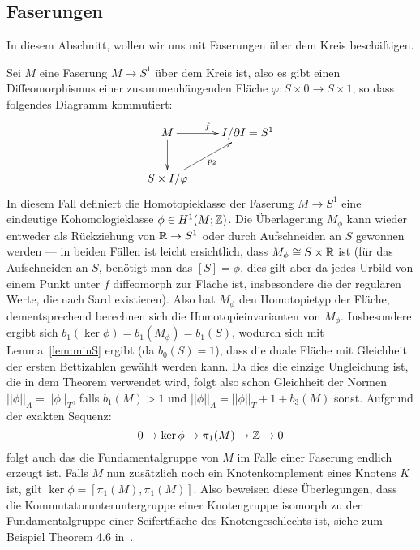     \subsection{Faserungen}

    In diesem Abschnitt, wollen wir uns mit Faserungen über dem Kreis beschäftigen.
        
    \begin{bsp}
    	Sei $M$ eine Faserung $M\to S^1$ über dem Kreis ist, also es gibt einen Diffeomorphismus einer zusammenhängenden Fläche $\varphi: S \times 0 \to S\times 1$, so dass folgendes Diagramm kommutiert:
    	\[
    		\begin{xy}
    			\xymatrix{M \ar[r]^f \ar[d] &I/\partial I = S^1 \\
    					S\times I /\varphi \ar[ru]_{p_2}}
    		\end{xy}
    	\]
    	In diesem Fall definiert die Homotopieklasse der Faserung $M \to S^1$ eine eindeutige Kohomologieklasse $\phi\in H^1(M;\mathbb{Z})$. Die Überlagerung $M_\phi$ kann wieder entweder als Rückziehung von $\mathbb{R} \to S^1$ oder durch Aufschneiden an $S$ gewonnen werden --- in beiden Fällen ist leicht ersichtlich, dass $M_\phi \cong S \times \mathbb{R}$ ist (für das Aufschneiden an $S$, benötigt man das $[S]=\phi$, dies gilt aber da jedes Urbild von einem Punkt unter $f$ diffeomorph zur Fläche ist, insbesondere die der regulären Werte, die nach Sard existieren). Also hat $M_\phi$ den Homotopietyp der Fläche, dementsprechend berechnen sich die Homotopieinvarianten von $M_\phi$.  Insbesondere ergibt sich $b_1(\ker\phi) =b_1(M_\phi)= b_1(S)$, wodurch sich mit Lemma~\ref{lem:minS} ergibt (da $b_0(S)=1$), dass die duale Fläche mit Gleichheit der ersten Bettizahlen gewählt werden kann. Da dies die einzige Ungleichung ist, die in dem Theorem verwendet wird, folgt also schon Gleichheit der Normen $||\phi||_A = ||\phi||_T$, falls $b_1(M)>1$ und $||\phi||_A = ||\phi||_T+1+b_3(M)$ sonst. Aufgrund der exakten Sequenz:
    	\[
    		0 \to \ker\phi \to \pi_1(M) \to \mathbb{Z} \to 0
    	\]
    	folgt auch das die Fundamentalgruppe von $M$ im Falle einer Faserung endlich erzeugt ist. Falls $M$ nun zusätzlich noch ein Knotenkomplement eines Knotens $K$ ist, gilt $\ker\phi = [\pi_1(M),\pi_1(M)]$. Also beweisen diese Überlegungen, dass die Kommutatorunteruntergruppe einer Knotengruppe isomorph zu der Fundamentalgruppe einer Seifertfläche des Knotengeschlechts ist, siehe zum Beispiel Theorem 4.6 in~\cite{Burde.2003}.\\

\end{bsp}
